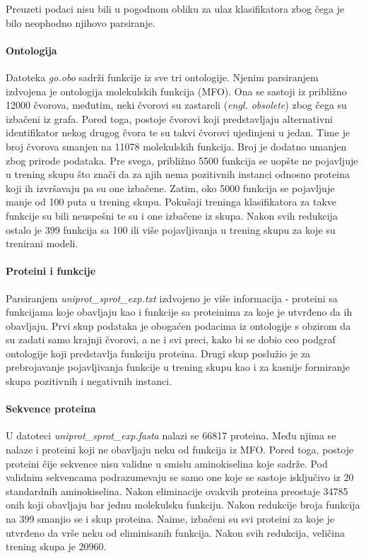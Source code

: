 Preuzeti podaci nisu bili u pogodnom obliku za ulaz klasifikatora zbog čega je bilo neophodno njihovo parsiranje.


\paragraph{Ontologija} Datoteka \textit{go.obo} sadrži funkcije iz sve tri ontologije. Njenim parsiranjem izdvojena je ontologija molekulskih funkcija (MFO). Ona se sastoji iz približno 12000 čvorova, međutim, neki čvorovi su zastareli (\textit{engl. obsolete}) zbog čega su izbačeni iz grafa. Pored toga, postoje čvorovi koji predstavljaju alternativni identifikator nekog drugog čvora te su takvi čvorovi ujedinjeni u jedan. Time je broj čvorova smanjen na 11078 molekulskih funkcija. Broj je dodatno umanjen zbog prirode podataka. Pre svega, približno 5500 funkcija se uopšte ne pojavljuje u trening skupu što znači da za njih nema pozitivnih instanci odnosno proteina koji ih izvršavaju pa su one izbačene. Zatim, oko 5000 funkcija se pojavljuje manje od 100 puta u trening skupu. Pokušaji treninga klasifikatora za takve funkcije su bili neuspešni te su i one izbačene iz skupa. Nakon svih redukcija ostalo je 399 funkcija sa 100 ili više pojavljivanja u trening skupu za koje su trenirani modeli.


\paragraph{Proteini i funkcije} Parsiranjem \textit{uniprot\_sprot\_exp.txt} izdvojeno je više informacija - proteini sa funkcijama koje obavljaju kao i funkcije sa proteinima za koje je utvrđeno da ih obavljaju. Prvi skup podataka je obogaćen podacima iz ontologije s obzirom da su zadati samo krajnji čvorovi, a ne i svi preci, kako bi se dobio ceo podgraf ontologije koji predstavlja funkciju proteina. Drugi skup poslužio je za prebrojavanje pojavljivanja funkcije u trening skupu kao i za kasnije formiranje skupa pozitivnih i negativnih instanci.


\paragraph{Sekvence proteina} U datoteci \textit{uniprot\_sprot\_exp.fasta} 
nalazi se 66817 proteina. Među njima se nalaze i proteini koji ne obavljaju neku od funkcija iz MFO. Pored toga, postoje proteini čije sekvence nisu validne u smislu aminokiselina koje sadrže. Pod validnim sekvencama podrazumevaju se samo one koje se sastoje isključivo iz 20 standardnih aminokiselina. Nakon eliminacije ovakvih proteina preostaje 34785 onih koji obavljaju bar jednu molekulsku funkciju. Nakon redukcije broja funkcija na 399 smanjio se i skup proteina. Naime, izbačeni su svi proteini za koje je utvrđeno da vrše neku od eliminisanih funkcija. Nakon svih redukcija, veličina trening skupa je 20960. 



